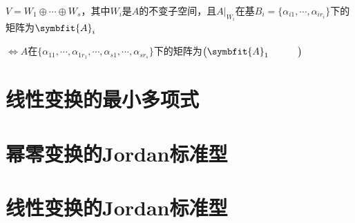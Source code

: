 \documentclass[12pt, a4paper, oneside, UTF8]{ctexbook}
\begin{document}
\begin{para}{0}
\begin{proposition}
						$V = W_1 \oplus \cdots \oplus W_s$，其中$W_i$是$A$的不变子空间，且$A|_{W_i}$在基$B_i=\{\alpha_{i1},\cdots,\alpha_{ir_i}\}$下的矩阵为$\symbfit{A}_i$

						$\Leftrightarrow A$在$\{\alpha_{11},\cdots,\alpha_{1r_1},\cdots,\alpha_{s1},\cdots,\alpha_{sr_s}\}$下的矩阵为$\begin{pmatrix}
							\symbfit{A}_1 & &  &  \\
							
						\end{pmatrix}$
					\end{proposition}
			\end{para}
	\section{线性变换的最小多项式}
	\section{幂零变换的Jordan标准型}
	\section{线性变换的Jordan标准型}
\ifx\allfiles\undefined
\end{document}

